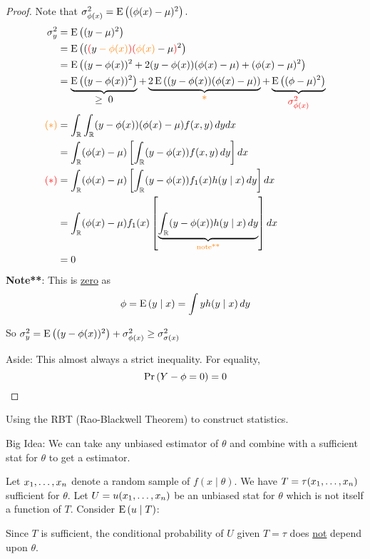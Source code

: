 \begin{proof}
\nl Note that $\sigma^2_{\phi(x)} = \E{(\phi(x)-\mu)^2}.$
\begin{align*}
    \sigma_y^2 &= \E{(y-\mu)^2}\\
    &= \E{(\color{red}(\color{black}y \color{orange}-\phi(x) \color{red})(\color{orange}\phi(x)\color{black}-\mu \color{red})\color{black}  ^2}\\
    &=\E{ (y-\phi(x))^2 + 2(y-\phi(x))(\phi(x)-\mu) + (\phi(x)-\mu)^2}\\
    &= \underbrace{\E{(y-\phi(x))^2}}_{\textstyle \geq\; 0} + \underbrace{2\E{(y-\phi(x))(\phi(x)-\mu)}}_{\textstyle \color{orange}\ast\color{black}} + \underbrace{\E{(\phi-\mu)^2}}_{\textstyle \color{red}\sigma^2_{\phi(x)}\color{black}}\\
    \color{orange}(\ast) \color{black} &= \int_{\R} \int_{\R} (y-\phi(x))(\phi(x)-\mu)f(x,y)\,dydx\\
    &= \int_{\R}(\phi(x)-\mu)\brac{\int_{\R}(y-\phi(x))f(x,y)\,dy}dx\\
    \color{red}(\ast) \color{black} &= \int_{\R} (\phi(x)-\mu)\brac{\int_{\R} (y-\phi(x)) f_1(x) h(y \mid x) \,dy }dx\\
    &= \int_{\R} (\phi(x)-\mu)f_1(x)\brac{\underbrace{\int_{\R} (y-\phi(x))h(y\mid x)\,dy}_{\text{\color{orange}note**\color{black}}}}dx\\
    &= 0
\end{align*}
\color{orange}\textbf{Note**}: This is \underline{zero} as $$\phi = \E{y \mid x} = \int yh(y\mid x)\,dy$$\color{black}

\nl So $\sigma^2_y = \E{(y-\phi(x))^2}+\sigma^2_{\phi(x)} \geq \sigma^2_{\sigma(x)}$

\nl Aside: This almost always a strict inequality. For equality,
$$\P{Y-\phi = 0} = 0$$
\end{proof}

\disc Using the RBT (Rao-Blackwell Theorem) to construct  statistics.

\nl Big Idea: We can take any unbiased estimator of $\theta$ and combine with a sufficient stat for $\theta$ to get a  estimator.

\nl Let ${x}_1, \dots, {x}_n$ denote a random sample of $f(x \mid \theta)$. We have $T = \tau({x}_1, \dots, {x}_n)$ sufficient for $\theta.$ Let $U = u({x}_1, \dots, {x}_n)$ be an unbiased stat for $\theta$ which is not itself a function of $T$. Consider $\E{u \mid T}$:

\noindent Since $T$ is sufficient, the conditional probability of $U$ given $T = \tau$ does \underline{not} depend upon $\theta$.

